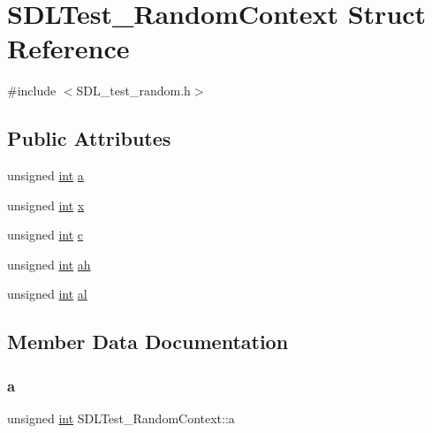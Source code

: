 \hypertarget{struct_s_d_l_test___random_context}{}\section{S\+D\+L\+Test\+\_\+\+Random\+Context Struct Reference}
\label{struct_s_d_l_test___random_context}


{\ttfamily \#include $<$S\+D\+L\+\_\+test\+\_\+random.\+h$>$}

\subsection*{Public Attributes}
\begin{DoxyCompactItemize}
\item 
unsigned \mbox{\hyperlink{warnings_8h_a74f207b5aa4ba51c3a2ad59b219a423b}{int}} \mbox{\hyperlink{struct_s_d_l_test___random_context_a24f830d6cb476c96fbe325c99331e45f}{a}}
\item 
unsigned \mbox{\hyperlink{warnings_8h_a74f207b5aa4ba51c3a2ad59b219a423b}{int}} \mbox{\hyperlink{struct_s_d_l_test___random_context_a8bd6d1b4e1677ed1c06f5cc09f1af5b6}{x}}
\item 
unsigned \mbox{\hyperlink{warnings_8h_a74f207b5aa4ba51c3a2ad59b219a423b}{int}} \mbox{\hyperlink{struct_s_d_l_test___random_context_a17a6a7e7b68a33c67d9b74c8c7c33198}{c}}
\item 
unsigned \mbox{\hyperlink{warnings_8h_a74f207b5aa4ba51c3a2ad59b219a423b}{int}} \mbox{\hyperlink{struct_s_d_l_test___random_context_a2c8d2f1ee16cdfd38361b8f03b3fdb85}{ah}}
\item 
unsigned \mbox{\hyperlink{warnings_8h_a74f207b5aa4ba51c3a2ad59b219a423b}{int}} \mbox{\hyperlink{struct_s_d_l_test___random_context_a0e2bccd3611d383d6510c6c828aa54c4}{al}}
\end{DoxyCompactItemize}


\subsection{Member Data Documentation}
\mbox{\label{struct_s_d_l_test___random_context_a24f830d6cb476c96fbe325c99331e45f}} 
\subsubsection{\texorpdfstring{a}{a}}
{\footnotesize\ttfamily unsigned \mbox{\hyperlink{warnings_8h_a74f207b5aa4ba51c3a2ad59b219a423b}{int}} S\+D\+L\+Test\+\_\+\+Random\+Context\+::a}

